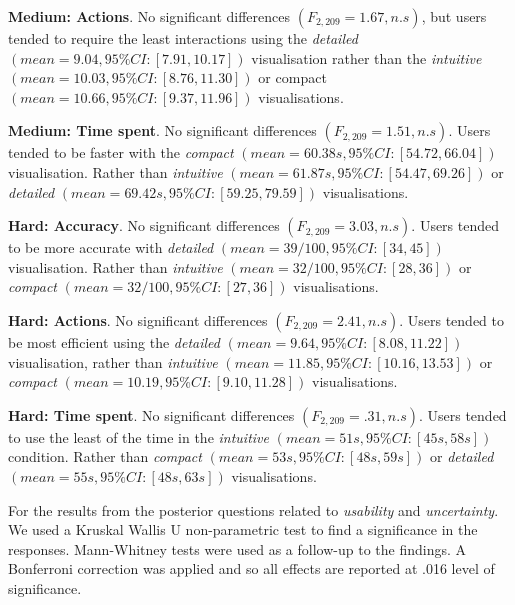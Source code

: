 \documentclass[final,5p,times,twocolumn,authoryear]{elsarticle}
\begin{document}
\textbf{Medium: Actions}. No significant differences $(F_{2, 209}= 1.67, n.s)$, but users tended to require the least interactions using the \emph{detailed} $(mean =  9.04, 95\% CI:[7.91, 10.17])$ visualisation rather than the \emph{intuitive} $(mean = 10.03, 95\% CI:[8.76, 11.30])$ or compact $(mean = 10.66, 95\% CI:[9.37, 11.96])$ visualisations.

\textbf{Medium: Time spent}. No significant differences $(F_{2, 209}= 1.51, n.s)$. Users tended to be faster with the \emph{compact} $(mean = 60.38s, 95\% CI:[54.72, 66.04])$ visualisation. Rather than \emph{intuitive} $(mean = 61.87s, 95\% CI:[54.47, 69.26])$ or \emph{detailed} $(mean = 69.42s, 95\% CI:[59.25, 79.59])$ visualisations.
   

\textbf{Hard: Accuracy}. No significant differences  $(F_{2, 209}= 3.03, n.s)$. Users tended to be more accurate with \emph{detailed} $(mean = 39/100, 95\% CI:[34, 45])$ visualisation. Rather than \emph{intuitive} $(mean = 32/100, 95\% CI:[28, 36])$ or \emph{compact} $(mean = 32/100, 95\% CI:[27, 36])$ visualisations. 

\textbf{Hard: Actions}. No significant differences $(F_{2, 209}= 2.41, n.s)$. Users tended to be most efficient using the \emph{detailed} $(mean =  9.64, 95\% CI:[8.08,  11.22])$ visualisation, rather than \emph{intuitive} $(mean = 11.85, 95\% CI:[10.16, 13.53])$ or \emph{compact} $(mean = 10.19, 95\% CI:[9.10,  11.28])$ visualisations.

\textbf{Hard: Time spent}. No significant differences $(F_{2, 209}= .31, n.s)$. Users tended to use the least of the time in the \emph{intuitive} $(mean = 51s, 95\% CI:[45s, 58s])$ condition. Rather than \emph{compact} $(mean = 53s, 95\% CI:[48s, 59s])$ or \emph{detailed} $(mean = 55s, 95\% CI:[48s, 63s])$ visualisations.

For the results from the posterior questions related to \emph{usability} and \emph{uncertainty}. We used a Kruskal Wallis U non-parametric test to find a significance in the responses. Mann-Whitney tests were used as a follow-up to the findings. A Bonferroni correction was applied and so all effects are reported at .016 level of significance.

\end{document}
